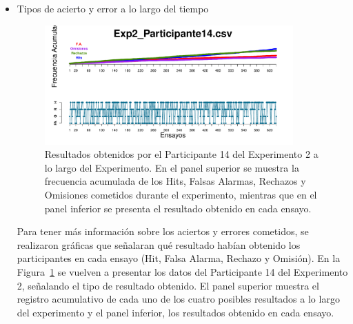 \begin{itemize}


	\item Tipos de acierto y error a lo largo del tiempo\\

\begin{figure}[th]
\centering
\includegraphics[width=0.90\textwidth]{Figures/Outcome_Exp2_P14}
\decoRule
\caption[Explorando datos individuales (ejemplo): Tipos de acierto y error obtenidos en cada ensayo]{Resultados obtenidos por el Participante 14 del Experimento 2 a lo largo del Experimento. En el panel superior se muestra la frecuencia acumulada de los Hits, Falsas Alarmas, Rechazos y Omisiones cometidos durante el experimento, mientras que en el panel inferior se presenta el resultado obtenido en cada ensayo.}
\label{fig:Outcome_E2_P14}
\end{figure}


Para tener más información sobre los aciertos y errores cometidos, se realizaron gráficas que señalaran qué resultado habían obtenido los participantes en cada ensayo (Hit, Falsa Alarma, Rechazo y Omisión). En la Figura~\ref{fig:Outcome_E2_P14} se vuelven a presentar los datos del Participante 14 del Experimento 2, señalando el tipo de resultado obtenido. El panel superior muestra el registro acumulativo de cada uno de los cuatro posibles resultados a lo largo del experimento y el panel inferior, los resultados obtenido en cada ensayo.\\ 



\end{itemize}










